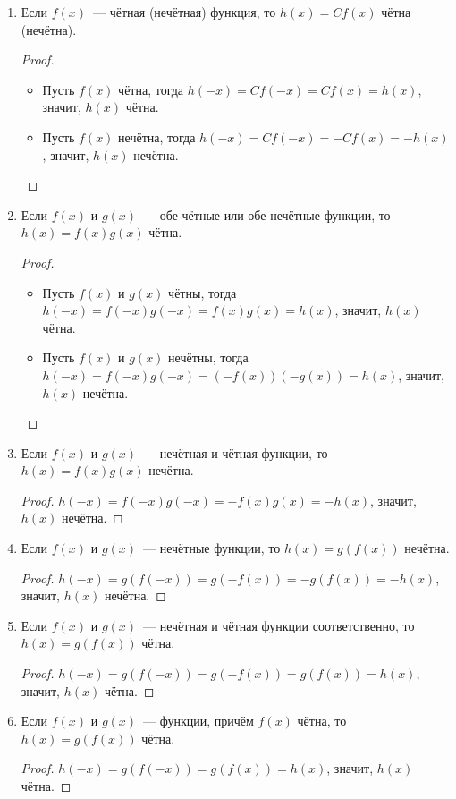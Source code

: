 \begin{enumerate}
	\item Если $f(x)$~--- чётная (нечётная) функция, то $h(x) = C f(x)$ чётна (нечётна).
	\begin{proof}
	\begin{itemize}
		\item Пусть $f(x)$ чётна, тогда $h(-x) = C f(-x) = C f(x) = h(x)$, значит, $h(x)$ чётна.
		\item Пусть $f(x)$ нечётна, тогда $h(-x) = C f(-x) = -C f(x) = -h(x)$, значит, $h(x)$ нечётна.
	\end{itemize}
	\end{proof}
	
	\item Если $f(x)$ и $g(x)$~--- обе чётные или обе нечётные функции, то $h(x) = f(x)g(x)$ чётна.
	\begin{proof}
	\begin{itemize}
		\item Пусть $f(x)$ и $g(x)$ чётны, тогда $h(-x) = f(-x)g(-x) = f(x)g(x) = h(x)$, значит, $h(x)$ чётна.
		\item Пусть $f(x)$ и $g(x)$ нечётны, тогда $h(-x) = f(-x)g(-x) = (-f(x)) (-g(x)) = h(x)$, значит, $h(x)$ нечётна.
	\end{itemize}
	\end{proof}
	
	\item Если $f(x)$ и $g(x)$~--- нечётная и чётная функции, то $h(x) = f(x)g(x)$ нечётна.
	\begin{proof}
	$h(-x) = f(-x)g(-x) = -f(x)g(x) = -h(x)$, значит, $h(x)$ нечётна.
	\end{proof}
	
	\item Если $f(x)$ и $g(x)$~--- нечётные функции, то $h(x) = g(f(x))$ нечётна.
	\begin{proof}
	$h(-x) = g(f(-x)) = g(-f(x)) = -g(f(x)) = -h(x)$, значит, $h(x)$ нечётна.
	\end{proof}
	
	\item Если $f(x)$ и $g(x)$~--- нечётная и чётная функции соответственно, то $h(x) = g(f(x))$ чётна.
	\begin{proof}
	$h(-x) = g(f(-x)) = g(-f(x)) = g(f(x)) = h(x)$, значит, $h(x)$ чётна.
	\end{proof}
	
	\item Если $f(x)$ и $g(x)$~--- функции, причём $f(x)$ чётна, то $h(x) = g(f(x))$ чётна.
	\begin{proof}
	$h(-x) = g(f(-x)) = g(f(x)) = h(x)$, значит, $h(x)$ чётна.
	\end{proof}
\end{enumerate}

